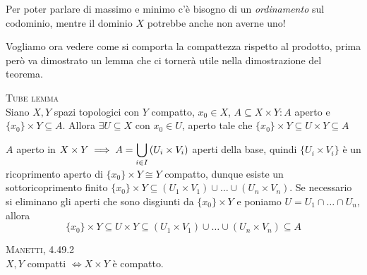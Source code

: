 \begin{observe}
	Per poter parlare di massimo e minimo c'è bisogno di un \textit{ordinamento} sul codominio, mentre il dominio $X$ potrebbe anche non averne uno!
\end{observe}
Vogliamo ora vedere come si comporta la compattezza rispetto al prodotto, prima però va dimostrato un lemma che ci tornerà utile nella dimostrazione del teorema.
\begin{lemming}\textsc{Tube lemma} \label{tube lemma}\\
	Siano $X,Y$ spazi topologici con $Y$ compatto, $x_0\in X$, $A\subseteq X\times Y\colon A$ aperto e $\{x_0\}\times Y\subseteq A$. Allora $\exists U\subseteq X$ con $x_0\in U$, aperto tale che $\{x_0\}\times Y \subseteq U\times Y \subseteq A$
\end{lemming}
\begin{demonstration}
	$A$ aperto in $\displaystyle X\times Y \implies A=\mathop{{\bigcup}}\displaylimits_{i\in I}\left( U_i\times V_i \right)$ aperti della base, quindi $\{U_i\times V_i\}$ è un ricoprimento aperto di $\{x_0\}\times Y \cong Y$ compatto, dunque esiste un sottoricoprimento finito $\{x_0\}\times Y\subseteq (U_1\times V_1)	\cup\dots\cup (U_n\times V_n)$. Se necessario si eliminano gli aperti che sono disgiunti da $\{x_0\}\times Y$ e poniamo $U=U_1\cap\dots\cap U_n$, allora
		\begin{equation*}
			\{x_0\}\times Y\subseteq U\times Y \subseteq (U_1\times V_1)	\cup\dots\cup (U_n\times V_n) \subseteq A
		\end{equation*}
\end{demonstration}
\begin{theorema}\textsc{Manetti, 4.49.2} \label{prodotto compatti}\\
	$X,Y$ compatti $\iff X\times Y$ è compatto.
\end{theorema}
